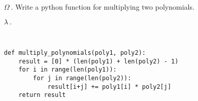 \documentclass{article}
\begin{document}
\ttfamily
\sloppy
\vspace*{\fill}
\begin{itemize}
	\item[\textcolor{RED20}{$\Omega ~.$}]\textcolor{RED20}{Write a python function for multiplying two polynomials.}
	\item[\textcolor{black}{$\lambda ~.$}]
\begin{verbatim}


def multiply_polynomials(poly1, poly2):
    result = [0] * (len(poly1) + len(poly2) - 1)
    for i in range(len(poly1)):
        for j in range(len(poly2)):
            result[i+j] += poly1[i] * poly2[j]
    return result
\end{verbatim}
\end{itemize}
\vspace*{\fill}
\end{document}
